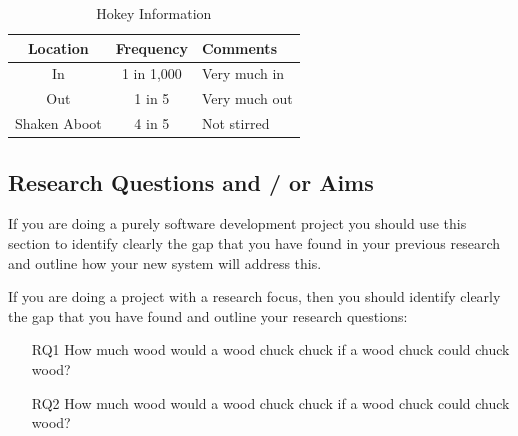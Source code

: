 \begin{table}
  \caption{Hokey Information}
  \label{tab:freq}
  \begin{tabular}{ccl}
    \toprule
    Location&Frequency&Comments\\
    \midrule
    In & 1 in 1,000& Very much in\\
    Out & 1 in 5& Very much out\\
    Shaken Aboot & 4 in 5 & Not stirred\\
  \bottomrule
\end{tabular}
\end{table}


\subsection{Research Questions and / or Aims}
If you are doing a purely software development project you should use this section to identify clearly the gap that you have found in your previous research and outline how your new system will address this. 

If you are doing a project with a research focus, then you should identify clearly the gap that you have found and outline your research questions:
\begin{itemize}
    \item [RQ1] How much wood would a wood chuck chuck if a wood chuck could chuck wood?
    \item [RQ2] How much wood would a wood chuck chuck if a wood chuck could chuck wood?
\end{itemize}

